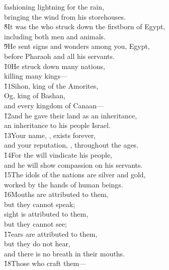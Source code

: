 \begin{poetry}
\poemll    fashioning lightning for the rain, \\
\poemlll       bringing the wind from his storehouses. \\
\poeml \v{8}It was the  who struck down the firstborn of Egypt, \\
\poemll    including both men and animals. \\
\poeml \v{9}He sent signs and wonders among you, Egypt, \\
\poemll    before Pharaoh and all his servants. \\
\poeml \v{10}He struck down many nations, \\
\poemll    killing many kings--- \\
\poeml \v{11}Sihon, king of the Amorites, \\
\poemll    Og, king of Bashan, \\
\poemlll       and every kingdom of Canaan--- \\
\poeml \v{12}and he gave their land as an inheritance, \\
\poemll    an inheritance to his people Israel. \\
\poeml \v{13}Your name, , exists forever, \\
\poemll    and your reputation, , throughout the ages. \\
\poeml \v{14}For the  will vindicate his people, \\
\poemll    and he will show compassion on his servants. \\
\poeml \v{15}The idols of the nations are silver and gold, \\
\poemll    worked by the hands of human beings. \\
\poeml \v{16}Mouths are attributed to them, \\
\poemll    but they cannot speak; \\
\poeml sight is attributed to them, \\
\poemll    but they cannot see; \\
\poeml \v{17}ears are attributed to them, \\
\poemll    but they do not hear, \\
\poemlll       and there is no breath in their mouths. \\
\poeml \v{18}Those who craft them--- \\

\end{poetry}
